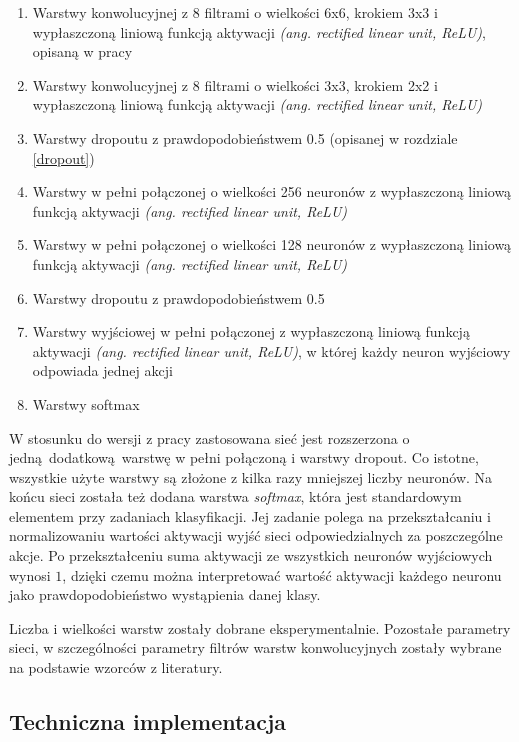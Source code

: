 \begin{enumerate}
\item{Warstwy konwolucyjnej z 8 filtrami o wielkości 6x6, krokiem 3x3 i wypłaszczoną liniową funkcją aktywacji \textit{(ang. rectified linear unit, ReLU)}, opisaną w pracy \cite{AISTATS2011_GlorotBB11}}
\item{Warstwy konwolucyjnej z 8 filtrami o wielkości 3x3, krokiem 2x2 i wypłaszczoną liniową funkcją aktywacji \textit{(ang. rectified linear unit, ReLU)}}
\item{Warstwy dropoutu z prawdopodobieństwem 0.5 (opisanej w rozdziale \ref{dropout})} 
\item{Warstwy w pełni połączonej o wielkości 256 neuronów z wypłaszczoną liniową funkcją aktywacji \textit{(ang. rectified linear unit, ReLU)}}
\item{Warstwy w pełni połączonej o wielkości 128 neuronów z wypłaszczoną liniową funkcją aktywacji \textit{(ang. rectified linear unit, ReLU)}}
\item{Warstwy dropoutu z prawdopodobieństwem 0.5}
\item{Warstwy wyjściowej w pełni połączonej z wypłaszczoną liniową funkcją aktywacji \textit{(ang. rectified linear unit, ReLU)}, w której każdy neuron wyjściowy odpowiada jednej akcji}
\item{Warstwy softmax}
\end{enumerate}

W stosunku do wersji z pracy \cite{DBLP:journals/corr/KempkaWRTJ16} zastosowana sieć jest rozszerzona o jedną dodatkową warstwę w pełni połączoną i warstwy dropout. Co istotne, wszystkie użyte warstwy są złożone z kilka razy mniejszej liczby neuronów. Na końcu sieci została też dodana warstwa \textit{softmax}, która jest standardowym elementem przy zadaniach klasyfikacji. Jej zadanie polega na przekształcaniu i normalizowaniu wartości aktywacji wyjść sieci odpowiedzialnych za poszczególne akcje. Po przekształceniu suma aktywacji ze wszystkich neuronów wyjściowych wynosi $1$, dzięki czemu można interpretować wartość aktywacji każdego neuronu jako prawdopodobieństwo wystąpienia danej klasy.

Liczba i wielkości warstw zostały dobrane eksperymentalnie. Pozostałe parametry sieci, w szczególności parametry filtrów warstw konwolucyjnych zostały wybrane na podstawie wzorców z literatury.

\subsection{Techniczna implementacja} \label{behavioral_cloning_tech}

